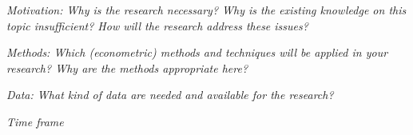 \documentclass[a4paper,11pt]{report}
\begin{document}
\textit{Motivation: Why is the research necessary? Why is the existing knowledge on this topic insufficient? How will the research address these issues?}

\textit{Methods: Which (econometric) methods and techniques will be applied in your research? Why are the methods appropriate here?}

\textit{Data: What kind of data are needed and available for the research?}

\textit{Time frame}




\end{document}
